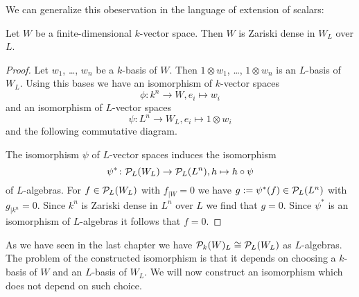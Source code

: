 We can generalize this obeservation in the language of extension of scalars:
\begin{lem}
 Let $W$ be a finite-dimensional $k$-vector space. Then $W$ is Zariski dense in $W_L$ over $L$.
\end{lem}
\begin{proof}
 Let $w_1$, \dots, $w_n$ be a $k$-basis of $W$. Then $1 \otimes w_1$, \dots, $1 \otimes w_n$ is an $L$-basis of $W_L$. Using this bases we have an isomorphism of $k$-vector spaces
 \[
  \phi \colon k^n \to W, e_i \mapsto w_i
 \]
 and an isomorphism of $L$-vector spaces
 \[
  \psi \colon L^n \to W_L, e_i \mapsto 1 \otimes w_i
 \]
 and the following commutative diagram.
 \begin{center}
 \end{center}
 The isomorphism $\psi$ of $L$-vector spaces induces the isomorphism
 \[
  \psi^* \colon \mathcal{P}_L(W_L) \to \mathcal{P}_L(L^n), h \mapsto h \circ \psi
 \]
 of $L$-algebras. For $f \in \mathcal{P}_L(W_L)$ with $f_{|W} = 0$ we have $g := \psi^*(f) \in \mathcal{P}_L(L^n)$ with $g_{|k^n} = 0$. Since $k^n$ is Zariski dense in $L^n$ over $L$ we find that $g = 0$. Since $\psi^*$ is an isomorphism of $L$-algebras it follows that $f = 0$.
\end{proof}


As we have seen in the last chapter we have $\mathcal{P}_k(W)_L \cong \mathcal{P}_L(W_L)$ as $L$-algebras. The problem of the constructed isomorphism is that it depends on choosing a $k$-basis of $W$ and an $L$-basis of $W_L$. We will now construct an isomorphism which does not depend on such choice.



